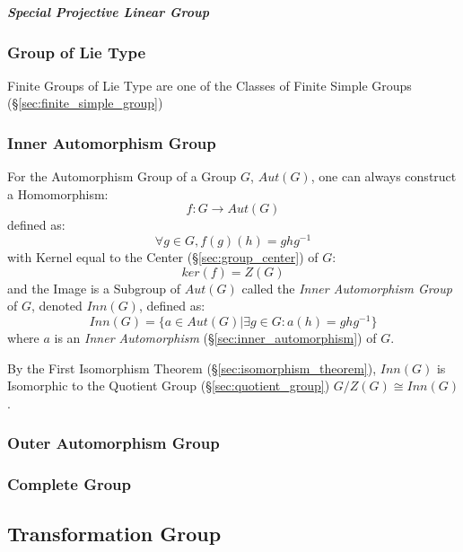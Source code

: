 \subparagraph{Special Projective Linear Group}
\label{sec:special_projective_linear_group}\hfill




\subsubsection{Group of Lie Type}\label{sec:lie_type_group}

Finite Groups of Lie Type are one of the Classes of Finite Simple Groups
(\S\ref{sec:finite_simple_group})



\subsubsection{Inner Automorphism Group}\label{sec:inner_automorphism_group}

For the Automorphism Group of a Group $G$, $Aut(G)$, one can always
construct a Homomorphism:
\[
    f : G \rightarrow Aut(G)
\]
defined as:
\[
    \forall g \in G, f (g) (h) = g h g^{-1}
\]
with Kernel equal to the Center (\S\ref{sec:group_center}) of $G$:
\[
    ker(f) = Z(G)
\]
and the Image is a Subgroup of $Aut(G)$ called the \emph{Inner
  Automorphism Group} of $G$, denoted $Inn(G)$, defined as:
\[
    Inn(G) = \{ a \in Aut(G) | \exists g \in G : a(h) = g h g^{-1} \}
\]
where $a$ is an \emph{Inner Automorphism}
(\S\ref{sec:inner_automorphism}) of $G$.

By the First Isomorphism Theorem (\S\ref{sec:isomorphism_theorem}),
$Inn(G)$ is Isomorphic to the Quotient Group
(\S\ref{sec:quotient_group}) $G / Z(G) \cong Inn(G)$.



\subsubsection{Outer Automorphism Group}\label{sec:outer_automorphism_group}

\subsubsection{Complete Group}\label{sec:complete_group}



\subsection{Transformation Group}\label{sec:transformation_group}

